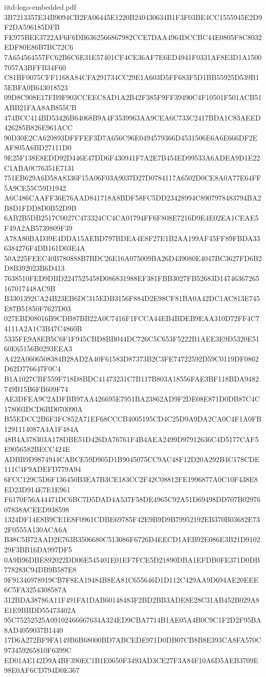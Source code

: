 \begin{filecontents*}[overwrite]{iitd-logo-embedded.pdf}
3B7213357E34B9094CB2FA06445E1220B240430634B1F3F03BE4CC1555945E2D9F2DA596185DFB
FE975BEE3722AF6F6DB6362566867982CCE7DAA4964DCCBC44E0805F8C8032EDF80E86B7BC72C6
7A654564557FC62B6C6E31E57401CF4CE36AF7E6ED4941F0331AF8E3D1A15007057A3BFFB34F60
C81BF0075CFF1168A84CFA291734CC29E1A603D5FF683F5D1BB55925D539B15EBFA0B643018523
09D8C908E17FB9F903CCEEC8AD1A2B42F385F9FF39490C4F10501F501ACB51ABB21FAA8AB855CB
474BCC414BD53426B64068B9A4F3539963AA9CEA6C733C2417BDA1C83AEED426285B826E961ACC
90D30E2CA620893DFFFEF3D7A656C96E0494579366D4531506E6A6E666DF2EAF805A6BD27111D0
9E25F138E8EDD92D446E47DD6F430941F7A2E7B454ED99533A6ADEA9D1E22C1ABA0C76351E7131
751EB629A6D58A8336F15A06F03A9037D27D0784117A6502D0CE8A0A77E64FF5A9CE55C59D1942
A6C486CAAFF36E76AAD841718A8BDF58FC5DD23428994C8907978483794BA2B8D1FDD8D0B52D9B
6AB2B5DB2517C0027C473324CC4CA01794FF6F808E7216D9E4E02EA1CEAE5F49A2AB5739809F39
A78A80BAD39E4DDA15AEBD797BDEA4E8F27E1B2AA199AF45FF89FBDA336384276F4DB161D03E4A
50A225FEEC40B780888B7BDC26E16A075009BA26D439080E4047BC3627FD6B2D8B392023B6D413
7638510FED9DBD2247525458D086831988EF381FBB3027FB52683D14746367265167017448AC9B
B3301392CA24B23EB6DC315EDB3156F884D2E98CF81BA0A42DC1AC813E745E87B51850F7627D03
027EBD08016B9CDB87BB22A0C7416F1FCCA44EB4BDEB9EAA310D72FF4C74111A2A1C3B47C4860B
5335FE9A8EB5C6F1F945CBD8BB044DC726C5C653F5222B1AEE3E9D5320E5160E65156B0293EEA3
A422A0606508384B28AD2A40F61583D87373B2C3FE74722592D59C0119DF0862D62D776647F0C4
B1A1027CBF559F718D8BDC41473231C7B117B803A18556FAE3BF118BDA9482749B15B6FB609F74
AE3DFEA9C2ADFBB97AA426695E7951BA23862AD9F2DE08E871D0DB87C4C178003DCD6BD070090A
B55EDCC2B6F3FC852A71EF68CCCB4005195CD4C25D9A9DA2CA0C4F1A0FB1291114087A4A1F484A
48B4A378303A178DBE51D426DA76761F4B4AEA2499D97912636C4D5177CAF5E9056582BECC424E
ADBB9D9874944CABCE59D905D1B9045075CC9AC48F12D20A292B4C178CDE111C4F9ADEFD779A94
6FCC129C5D6F136450B3EA7B3CE183CC2F42C08812FE1996877A0C10F438E8ED23D914E7E1E961
F6170F56A44471DC6BC7D5DAD4A537F58DE4965C92A51D69498DD707B0297607838ACEED938598
1324DF14E8B9CE1E8F0961CDBE69785F42E9B9D9B79952192EB370B03682E732F0555A130ACA6A
B38C5B72AAD2E763B3506680C513086F6726D4EECD1AEB92E086E3B21D910229F3BB16DA997DF5
0A9B96DBE892022DD06E545401E01EF7FCE5D21890DBA1EFDB0FE371D0DB778283C94DB9B587E8
9F91346978919CB7F8EA19484B8EA81C655646D1D112C429AA9D694AE20EEE6C5FA3254308587A
312BDA38786A11F491FA1DAB60148483F2BD2BB3ADE8E28C31AB452B029A8E1E9BBDD55473402A
95C75252525A09102466667634A324ED9CBA7714B1AE05A4B0C9C1F2D2F95BA8AD4059037B1440
17D6A272BF9FA149B6B68000BD7ABCEDE971D0DB07CB8B8E393CA8FA570C973459265810F6399C
ED01AE142D9A4BF390EC1B1E0650F3493AD3CE27F3A84F10A6D5AEB3709E98E0AF6CD794D0E367

\end{filecontents*}
